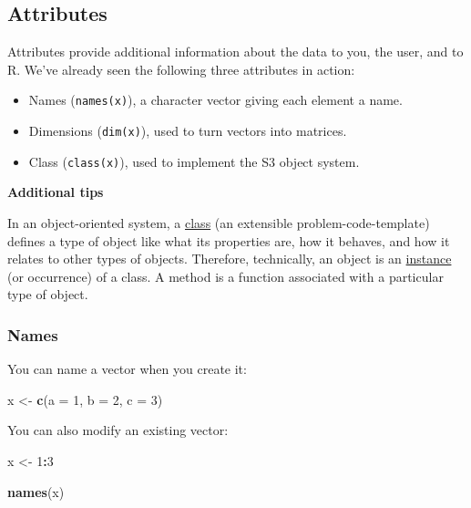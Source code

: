 \documentclass[
]{book}
\newenvironment{Shaded}{\begin{snugshade}}{\end{snugshade}}
\newcommand{\AttributeTok}[1]{\textcolor[rgb]{0.13,0.29,0.53}{#1}}
\newcommand{\DecValTok}[1]{\textcolor[rgb]{0.00,0.00,0.81}{#1}}
\newcommand{\FunctionTok}[1]{\textcolor[rgb]{0.13,0.29,0.53}{\textbf{#1}}}
\newcommand{\NormalTok}[1]{#1}
\newcommand{\OtherTok}[1]{\textcolor[rgb]{0.56,0.35,0.01}{#1}}
\newcommand{\SpecialCharTok}[1]{\textcolor[rgb]{0.81,0.36,0.00}{\textbf{#1}}}
\begin{document}
\subsection{Attributes}\label{attributes}

Attributes provide additional information about the data to you, the user, and to R. We've already seen the following three attributes in action:

\begin{itemize}
\item
  Names (\texttt{names(x)}), a character vector giving each element a name.
\item
  Dimensions (\texttt{dim(x)}), used to turn vectors into matrices.
\item
  Class (\texttt{class(x)}), used to implement the S3 object system.
\end{itemize}

\textbf{Additional tips}

In an object-oriented system, a \href{https://www.google.com/search?q=what+is+class+programming&oq=what+is+class+programming&aqs=chrome.0.0l6.3543j0j4&sourceid=chrome&ie=UTF-8}{class} (an extensible problem-code-template) defines a type of object like what its properties are, how it behaves, and how it relates to other types of objects. Therefore, technically, an object is an \href{https://en.wikipedia.org/wiki/Instance_(computer_science)}{instance} (or occurrence) of a class. A method is a function associated with a particular type of object.

\subsubsection{Names}\label{names}

You can name a vector when you create it:

\begin{Shaded}
\begin{Highlighting}[]
\NormalTok{x }\OtherTok{\textless{}{-}} \FunctionTok{c}\NormalTok{(}\AttributeTok{a =} \DecValTok{1}\NormalTok{, }\AttributeTok{b =} \DecValTok{2}\NormalTok{, }\AttributeTok{c =} \DecValTok{3}\NormalTok{)}
\end{Highlighting}
\end{Shaded}

You can also modify an existing vector:

\begin{Shaded}
\begin{Highlighting}[]
\NormalTok{x }\OtherTok{\textless{}{-}} \DecValTok{1}\SpecialCharTok{:}\DecValTok{3}

\FunctionTok{names}\NormalTok{(x)}
\end{Highlighting}
\end{Shaded}
\end{document}
